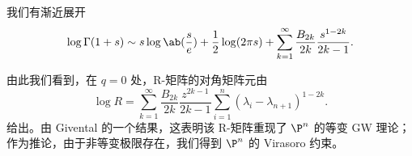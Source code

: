 \begin{lem}
    我们有渐近展开
    \[ \log \Gamma(1+s) \sim s \log \ab(\frac{s}{e}) + \frac{1}{2} \log(2\pi s) + \sum_{k=1}^{\infty} \frac{B_{2k}}{2k} \frac{s^{1-2k}}{2k-1}. \]
\end{lem}
由此我们看到，在 \(q = 0\) 处，R-矩阵的对角矩阵元由
\[ \log R = \sum_{k=1}^{\infty} \frac{B_{2k}}{2k} \frac{z^{2k-1}}{2k-1} \sum_{i =1}^n (\lambda_i - \lambda_{n+1})^{1-2k}. \]
给出。由 Givental 的一个结果，这表明该 R-矩阵重现了 \(\P^n\) 的等变 GW 理论；作为推论，由于非等变极限存在，我们得到 \(\P^n\) 的 Virasoro 约束。

